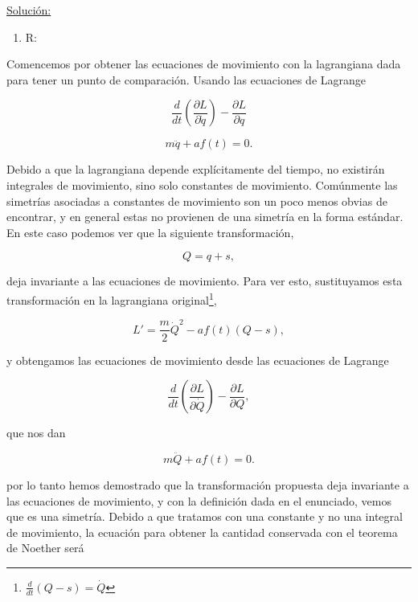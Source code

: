 \documentclass[a4paper,10pt]{article}
\numberwithin{equation}{section}
\begin{document}
\underline{Solución:} \vspace{.3cm}

\begin{enumerate}[label=\alph*)]
 \item R:
\end{enumerate}

Comencemos por obtener las ecuaciones de movimiento con la lagrangiana dada para 
tener un punto de comparación. Usando las ecuaciones de Lagrange 

\begin{equation}
 \frac{d}{dt}\left(\frac{\partial L}{\partial \dot{q}}\right) 
 - \frac{\partial L}{\partial q}
\end{equation}

\begin{equation}
 m\ddot{q} + af(t) = 0.
\end{equation}

Debido a que la lagrangiana depende explícitamente del tiempo, no existirán integrales 
de movimiento, sino solo constantes de movimiento. Comúnmente las simetrías asociadas 
a constantes de movimiento son un poco menos obvias de encontrar, y en general estas 
no provienen de una simetría en la forma estándar. En este caso podemos ver que 
la siguiente transformación, 

\begin{equation}
 Q = q + s,
\end{equation}

deja invariante a las ecuaciones de movimiento. Para ver esto, sustituyamos esta 
transformación en la lagrangiana original\footnote{$\frac{d}{dt}(Q -s) = \dot{Q}$},

\begin{equation}
 L' = \frac{m}{2}\dot{Q}^2 - af(t)(Q-s),
\end{equation}

y obtengamos las ecuaciones de movimiento desde las ecuaciones de Lagrange

\begin{equation}
 \frac{d}{dt}\left(\frac{\partial L}{\partial \dot{Q}}\right) 
 - \frac{\partial L}{\partial Q},
\end{equation}

que nos dan

\begin{equation}
 m\ddot{Q} + af(t) = 0.
\end{equation}

por lo tanto hemos demostrado que la transformación propuesta deja invariante a las 
ecuaciones de movimiento, y con la definición dada en el enunciado, vemos que es 
una simetría. Debido a que tratamos con una constante y no una integral de movimiento, 
la ecuación para obtener la cantidad conservada con el teorema de Noether será 
\end{document}
